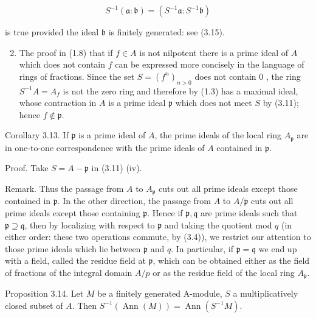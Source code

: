 \documentclass{standalone}
\theoremstyle{definition}
\theoremstyle{remark}
\begin{document}
\[
S^{-1}(\mathfrak{a}: \mathfrak{b})=\left(S^{-1} \mathfrak{a}: S^{-1} \mathfrak{b}\right)
\]

is true provided the ideal $\mathfrak{b}$ is finitely generated: see (3.15).

\begin{enumerate}
  \setcounter{enumi}{1}
  \item The proof in (1.8) that if $f \in A$ is not nilpotent there is a prime ideal of $A$ which does not contain $f$ can be expressed more concisely in the language of rings of fractions. Since the set $S=\left(f^{n}\right)_{n>0}$ does not contain 0 , the ring $S^{-1} A=A_{f}$ is not the zero ring and therefore by (1.3) has a maximal ideal, whose contraction in $A$ is a prime ideal $\mathfrak{p}$ which does not meet $S$ by (3.11); hence $f \notin \mathfrak{p}$.
\end{enumerate}

\begin{center}
\end{center}

Corollary 3.13. If $\mathfrak{p}$ is a prime ideal of $A$, the prime ideals of the local ring $A_{\mathfrak{p}}$ are in one-to-one correspondence with the prime ideals of $A$ contained in $\mathfrak{p}$.

Proof. Take $S=A-\mathfrak{p}$ in (3.11) (iv).

Remark. Thus the passage from $A$ to $A_{\mathfrak{p}}$ cuts out all prime ideals except those contained in $\mathfrak{p}$. In the other direction, the passage from $A$ to $A / \mathfrak{p}$ cuts out all prime ideals except those containing $\mathfrak{p}$. Hence if $\mathfrak{p}, \mathfrak{q}$ are prime ideals such that $\mathfrak{p} \supseteq \mathfrak{q}$, then by localizing with respect to $\mathfrak{p}$ and taking the quotient mod $q$ (in either order: these two operations commute, by (3.4)), we restrict our attention to those prime ideals which lie between $\mathfrak{p}$ and $q$. In particular, if $\mathfrak{p}=\mathfrak{q}$ we end up with a field, called the residue field at $\mathfrak{p}$, which can be obtained either as the field of fractions of the integral domain $A / p$ or as the residue field of the local ring $A_{\mathfrak{p}}$.

Proposition 3.14. Let $M$ be a finitely generated A-module, $S$ a multiplicatively closed subset of $A$. Then $S^{-1}(\operatorname{Ann}(M))=\operatorname{Ann}\left(S^{-1} M\right)$.
\end{document}
